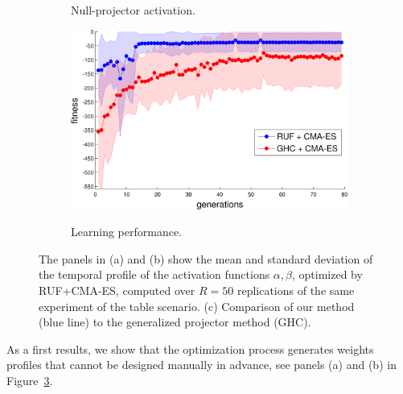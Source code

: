\begin{figure}
\begin{subfigure}{.3\linewidth}
  \label{fig:alpha2}
  \caption{Null-projector activation.}
\end{subfigure}
\begin{subfigure}{.3\linewidth}
  \centering
  \includegraphics[width=\linewidth]{./sections/WP4/pics_serena/comparison}
  \label{fig:alpha3}
  \caption{Learning performance.}
\end{subfigure}
\caption{The panels in (a) and (b) show the mean and standard deviation of the temporal
profile of the activation functions $\alpha,\beta$, optimized by RUF+CMA-ES,
computed over $R=50$ replications of the same experiment of the table scenario.
(c) Comparison of our method (blue line) to the generalized projector method (GHC).}
\label{fig:activation_policy}
\end{figure}

As a first results, we show that the optimization process  generates weights
profiles that cannot be designed manually in advance, see panels (a) and (b) in 
Figure~\ref{fig:activation_policy}.


